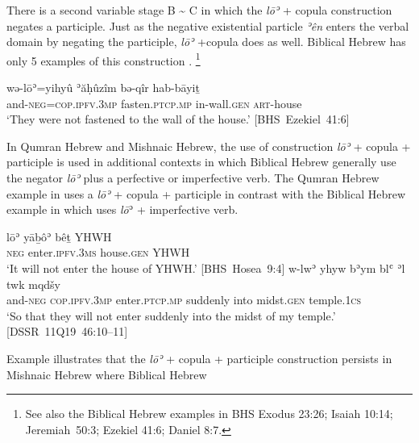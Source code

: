 ﻿\documentclass[output=paper]{langsci/langscibook}
\begin{document}
There is a second variable stage B {\textasciitilde} C in which the
\textit{lōʾ} + copula construction negates a participle. Just as the
negative existential particle \textit{ʾên} enters the verbal domain by
negating the participle, \textit{lōʾ} +copula does as well. Biblical Hebrew
has only 5 examples of this construction .%
%
    \footnote{See also the Biblical Hebrew examples in BHS Exodus 23:26; Isaiah
    10:14; Jeremiah~50:3; Ezekiel 41:6; Daniel 8:7.} 
%
\begin{exe}\ex \label{ex:heb-fastened}
    \gll wə-lōʾ=yihyû ʾăḥûzîm bə-qîr hab-bāyiṯ \\
  and-\textsc{neg}=\textsc{cop.ipfv.3mp} fasten.\textsc{ptcp.mp}   in-wall.\textsc{gen}   \textsc{art}-house \\
    \glt `They were not fastened to the wall of the house.'
    \mbox{[BHS Ezekiel 41:6]}
    \end{exe}
%
In Qumran Hebrew and Mishnaic Hebrew, the use of construction \textit{lōʾ}
+ copula + participle is used in additional contexts in which Biblical
Hebrew generally use the negator \textit{lōʾ} plus a perfective or
imperfective verb. The Qumran Hebrew example in  uses a
\textit{lōʾ} + copula + participle in contrast with the Biblical Hebrew example
in  which uses \textit{lō}ʾ + imperfective verb.
%
\begin{exe}\ex\begin{xlist}
\ex\label{ex:heb-enter-house}
\gll lōʾ yāḇôʾ bêṯ YHWH\\
\textsc{neg} enter.\textsc{ipfv.3ms} house.\textsc{gen} YHWH \\
\glt `It will not enter the house of YHWH.' \mbox{[BHS
Hosea 9:4]}
%
\ex\label{ex:heb-enter-temple}
\gll w-lwʾ yhyw bʾym blʿ ʾl twk mqdšy \\
and-\textsc{neg} \textsc{cop.ipfv.3mp} enter.\textsc{ptcp.mp} suddenly 
into midst.\textsc{gen} temple.\textsc{1cs} \\
\glt `So that they will not enter suddenly into the midst of my temple.' \\
\mbox{[DSSR 11Q19 46:10--11]}
\end{xlist}\end{exe}
%
Example  illustrates that the \textit{lōʾ} + copula
+ participle construction persists in Mishnaic Hebrew where Biblical Hebrew
\end{document}
